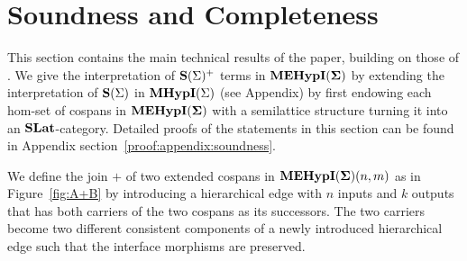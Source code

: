 \section{Soundness and Completeness}\label{sec:soundness-and-completeness}

This section contains the main technical results of the paper,  building on those of \cite{bonchi_string_2022-2}.
We give the interpretation of $\mathbf{S}(\Sigma)^{+}$ terms in ${\mathbf{MEHypI(\Sigma)}}$ by extending the interpretation of $\mathbf{S}(\Sigma)$ in $\textbf{MHypI}(\Sigma)$ (see Appendix) by first endowing each hom-set of cospans in ${\mathbf{MEHypI(\Sigma)}}$ with a semilattice structure turning it into an $\mathbf{SLat}$-category.
Detailed proofs of the statements in this section can be found in Appendix section~\ref{proof:appendix:soundness}.


\begin{definition}
We define the join $+$ of two extended cospans in ${\mathbf{MEHypI(\Sigma)}}(n,m)$ as in Figure~\ref{fig:A+B}
by introducing a hierarchical edge with $n$ inputs and $k$ outputs that has both carriers of the two cospans as its successors.
The two carriers become two different consistent components of a newly introduced hierarchical edge such that the interface morphisms are preserved.

\end{definition}

